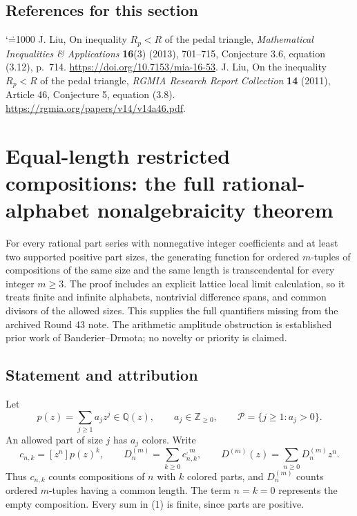 \documentclass[11pt,a4paper]{article}
\makeatletter
\numberwithin{equation}{section}
\theoremstyle{definition}
\theoremstyle{remark}
\newenvironment{sectionabstract}{\par\smallskip\begingroup\small\noindent}{\par\endgroup\medskip}
\renewenvironment{thebibliography}[1]
 {\subsection*{References for this section}\small
  \list{\@biblabel{\@arabic\c@enumiv}}
       {\settowidth\labelwidth{\@biblabel{#1}}\leftmargin\labelwidth
        \advance\leftmargin\labelsep\@openbib@code
        \usecounter{enumiv}\let\p@enumiv\@empty
        \renewcommand\theenumiv{\@arabic\c@enumiv}}
  \sloppy\clubpenalty4000\widowpenalty4000\sfcode`\.=1000\relax}
 {\def\@noitemerr{\@latex@warning{Empty bibliography}}\endlist}
\makeatother
\begin{document}
\begin{thebibliography}{9}
 J. Liu, On inequality $R_p<R$ of the pedal triangle,
\emph{Mathematical Inequalities \& Applications} \textbf{16}(3) (2013),
701--715, Conjecture 3.6, equation (3.12), p.~714.
\url{https://doi.org/10.7153/mia-16-53}.
 J. Liu, On the inequality $R_p<R$ of the pedal triangle,
\emph{RGMIA Research Report Collection} \textbf{14} (2011), Article 46,
Conjecture 5, equation (3.8).
\url{https://rgmia.org/papers/v14/v14a46.pdf}.
\end{thebibliography}

\par\endgroup

\begingroup
\newcommand{\Qbar}{\overline{\mathbb Q}}
\newcommand{\E}{\mathbb E}
\newcommand{\Prob}{\mathbb P}
\clearpage
\section{\texorpdfstring{Equal-length restricted compositions: the full rational-alphabet nonalgebraicity theorem}{Equal-length restricted compositions: the full rational-alphabet nonalgebraicity theorem}}\label{section:add43taisho}
\par\medskip


\begin{sectionabstract}
For every rational part series with nonnegative integer coefficients and at
least two supported positive part sizes, the generating function for ordered
$m$-tuples of compositions of the same size and the same length is
transcendental for every integer $m\ge3$.  The proof includes an explicit
lattice local limit calculation, so it treats finite and infinite alphabets,
nontrivial difference spans, and common divisors of the allowed sizes.
This supplies the full quantifiers missing from the archived Round 43 note.
The arithmetic amplitude obstruction is established prior work of
Banderier--Drmota; no novelty or priority is claimed.
\end{sectionabstract}

\subsection{Statement and attribution}
Let
\[
 p(z)=\sum_{j\ge1}a_jz^j\in\mathbb Q(z),\qquad
 a_j\in\mathbb Z_{\ge0},
 \qquad \mathcal P=\{j\ge1:a_j>0\}.
\]
An allowed part of size $j$ has $a_j$ colors.  Write
\[
 c_{n,k}=[z^n]p(z)^k,\qquad
 D_n^{(m)}=\sum_{k\ge0}c_{n,k}^{,m},\qquad
 D^{(m)}(z)=\sum_{n\ge0}D_n^{(m)}z^n.                 \tag{1}
\]
Thus $c_{n,k}$ counts compositions of $n$ with $k$ colored parts, and
$D_n^{(m)}$ counts ordered $m$-tuples having a common length.
The term $n=k=0$ represents the empty composition.  Every sum in (1) is
finite, since parts are positive.
\end{document}
